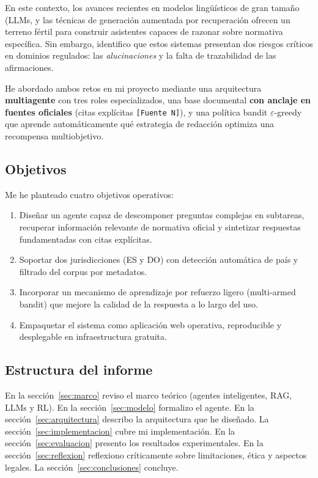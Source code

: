 \documentclass[11pt,a4paper]{article}
\begin{document}
En este contexto, los avances recientes en modelos lingüísticos de gran tamaño (LLMs, y las técnicas de generación aumentada por recuperación ofrecen un terreno fértil para construir asistentes capaces de razonar sobre normativa específica. Sin embargo, identifico que estos sistemas presentan dos riesgos críticos en dominios regulados: las \emph{alucinaciones} y la falta de trazabilidad de las afirmaciones.

He abordado ambos retos en mi proyecto mediante una arquitectura \textbf{multiagente} con tres roles especializados, una base documental \textbf{con anclaje en fuentes oficiales} (citas explícitas \texttt{[Fuente~N]}), y una política bandit $\varepsilon$-greedy \cite{sutton2018reinforcement} que aprende automáticamente qué estrategia de redacción optimiza una recompensa multiobjetivo.

\subsection{Objetivos}

Me he planteado cuatro objetivos operativos:

\begin{enumerate}
  \item Diseñar un agente capaz de descomponer preguntas complejas en subtareas, recuperar información relevante de normativa oficial y sintetizar respuestas fundamentadas con citas explícitas.
  \item Soportar dos jurisdicciones (ES y DO) con detección automática de país y filtrado del corpus por metadatos.
  \item Incorporar un mecanismo de aprendizaje por refuerzo ligero (multi-armed bandit) que mejore la calidad de la respuesta a lo largo del uso.
  \item Empaquetar el sistema como aplicación web operativa, reproducible y desplegable en infraestructura gratuita.
\end{enumerate}

\subsection{Estructura del informe}

En la sección~\ref{sec:marco} reviso el marco teórico (agentes inteligentes, RAG, LLMs y RL). En la sección~\ref{sec:modelo} formalizo el agente. En la sección~\ref{sec:arquitectura} describo la arquitectura que he diseñado. La sección~\ref{sec:implementacion} cubre mi implementación. En la sección~\ref{sec:evaluacion} presento los resultados experimentales. En la sección~\ref{sec:reflexion} reflexiono críticamente sobre limitaciones, ética y aspectos legales. La sección~\ref{sec:conclusiones} concluye.
\end{document}
